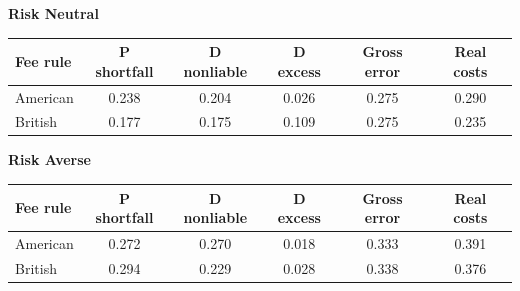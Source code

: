 \documentclass[10pt,border=5pt,varwidth=17cm]{standalone}
\begin{document}
\begingroup
\small
\setlength{\tabcolsep}{5pt}
\renewcommand{\arraystretch}{1.20}
\noindent\textbf{Risk Neutral}\par\smallskip
\noindent\begin{tabularx}{\linewidth}{@{}>{\raggedright\arraybackslash}Xccccc@{}}
\toprule
\textbf{Fee rule} & \textbf{P shortfall} & \textbf{D nonliable} & \textbf{D excess} & \textbf{Gross error} & \textbf{Real costs} \\
\midrule
American & 0.238 & 0.204 & 0.026 & 0.275 & 0.290 \\
British & 0.177 & 0.175 & 0.109 & 0.275 & 0.235 \\
\bottomrule\end{tabularx}\par\medskip
\noindent\textbf{Risk Averse}\par\smallskip
\noindent\begin{tabularx}{\linewidth}{@{}>{\raggedright\arraybackslash}Xccccc@{}}
\toprule
\textbf{Fee rule} & \textbf{P shortfall} & \textbf{D nonliable} & \textbf{D excess} & \textbf{Gross error} & \textbf{Real costs} \\
\midrule
American & 0.272 & 0.270 & 0.018 & 0.333 & 0.391 \\
British & 0.294 & 0.229 & 0.028 & 0.338 & 0.376 \\
\bottomrule\end{tabularx}\par\medskip
\endgroup
\end{document}
